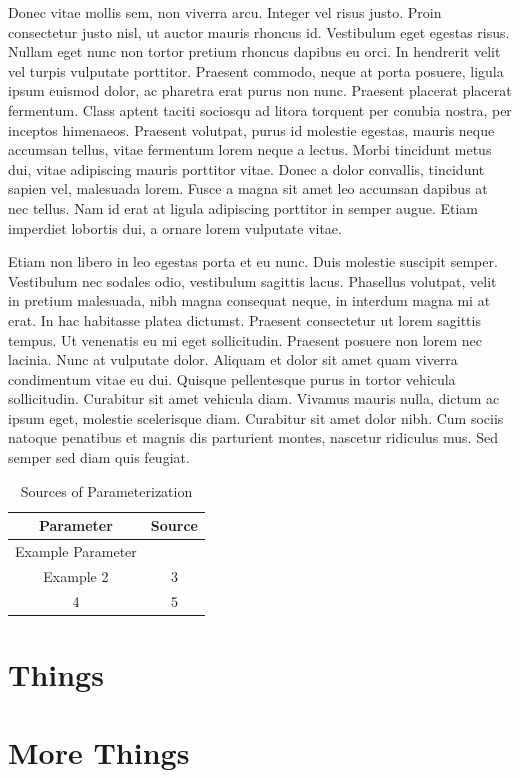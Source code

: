 \documentclass[double,12pt]{beavtex}
\begin{document}
Donec vitae mollis sem, non viverra arcu. Integer vel risus justo. Proin consectetur justo nisl, ut auctor mauris rhoncus id. Vestibulum eget egestas risus. Nullam eget nunc non tortor pretium rhoncus dapibus eu orci. In hendrerit velit vel turpis vulputate porttitor. Praesent commodo, neque at porta posuere, ligula ipsum euismod dolor, ac pharetra erat purus non nunc. Praesent placerat placerat fermentum. Class aptent taciti sociosqu ad litora torquent per conubia nostra, per inceptos himenaeos. Praesent volutpat, purus id molestie egestas, mauris neque accumsan tellus, vitae fermentum lorem neque a lectus. Morbi tincidunt metus dui, vitae adipiscing mauris porttitor vitae. Donec a dolor convallis, tincidunt sapien vel, malesuada lorem. Fusce a magna sit amet leo accumsan dapibus at nec tellus. Nam id erat at ligula adipiscing porttitor in semper augue. Etiam imperdiet lobortis dui, a ornare lorem vulputate vitae. 

Etiam non libero in leo egestas porta et eu nunc. Duis molestie suscipit semper. Vestibulum nec sodales odio, vestibulum sagittis lacus. Phasellus volutpat, velit in pretium malesuada, nibh magna consequat neque, in interdum magna mi at erat. In hac habitasse platea dictumst. Praesent consectetur ut lorem sagittis tempus. Ut venenatis eu mi eget sollicitudin. Praesent posuere non lorem nec lacinia. Nunc at vulputate dolor. Aliquam et dolor sit amet quam viverra condimentum vitae eu dui. Quisque pellentesque purus in tortor vehicula sollicitudin. Curabitur sit amet vehicula diam. Vivamus mauris nulla, dictum ac ipsum eget, molestie scelerisque diam. Curabitur sit amet dolor nibh. Cum sociis natoque penatibus et magnis dis parturient montes, nascetur ridiculus mus. Sed semper sed diam quis feugiat. 

\pagebreak



\pagebreak

\appendix

\begin{table}[ht]
\centering
\caption{Sources of Parameterization}
\begin{tabular}[t]{cc}
\toprule
Parameter&Source\\
\midrule
Example Parameter& \cite{bockheimNutrientDynamicsDecomposing2011}\\
Example 2&3\\
4&5\\
\bottomrule
\end{tabular}
\end{table}%

\chapter{Things}





\chapter{More Things}
\end{document}
